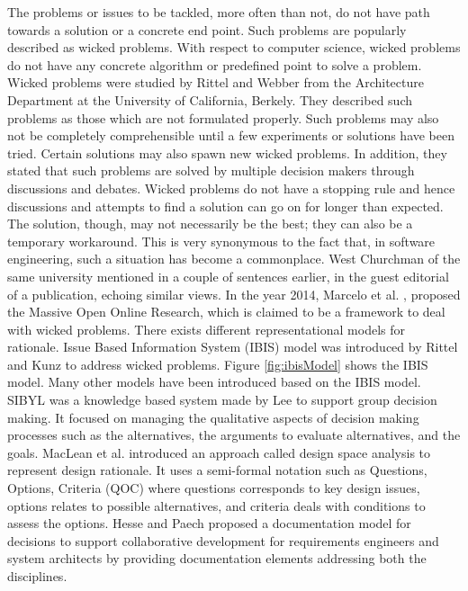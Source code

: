 \documentclass[a4paper,12pt,twoside]{report}
\begin{document}
The problems or issues to be tackled, more often than not, do not have path towards a solution or a concrete end point. Such problems are popularly described as wicked problems. With respect to computer science, wicked problems do not have any concrete algorithm or predefined point to solve a problem. Wicked problems were studied by Rittel and Webber \cite{Rittel1973} from the Architecture Department at the University of California, Berkely. They described such problems as those which are not formulated properly. Such problems may also not be completely comprehensible until a few experiments or solutions have been tried. Certain solutions may also spawn new wicked problems. In addition, they stated that such problems are solved by multiple decision makers through discussions and debates. Wicked problems do not have a stopping rule and hence discussions and attempts to find a solution can go on for longer than expected. The solution, though, may not necessarily be the best; they can also be a temporary workaround. This is very synonymous to the fact that, in software engineering, such a situation has become a commonplace. West Churchman \cite{InstituteofManagementSciences.1967} of the same university mentioned in a couple of sentences earlier, in the guest editorial of a publication, echoing similar views. In the year 2014, Marcelo et al. \cite{Machado2014}, proposed the Massive Open Online Research, which is claimed to be a framework to deal with wicked problems. 
\newline \newline
There exists different representational models for rationale. Issue Based Information System (IBIS) model was introduced by Rittel and Kunz \cite{Kunz1970} to address wicked problems. Figure \ref{fig:ibisModel} shows the IBIS model. Many other models have been introduced based on the IBIS model. SIBYL was a knowledge based system made by Lee \cite{Lee1990} to support group decision making. It focused on managing the qualitative aspects of decision making processes such as the alternatives, the arguments to evaluate alternatives, and the goals. MacLean et al. \cite{Maclean1991} introduced an approach called design space analysis to represent design rationale. It uses a semi-formal notation such as Questions, Options, Criteria (QOC) where questions corresponds to key design issues, options relates to possible alternatives, and criteria deals with conditions to assess the options. Hesse and Paech \cite{Hesse2013} proposed a documentation model for decisions to support collaborative development for requirements engineers and system architects by providing documentation elements addressing both the disciplines.
\end{document}
